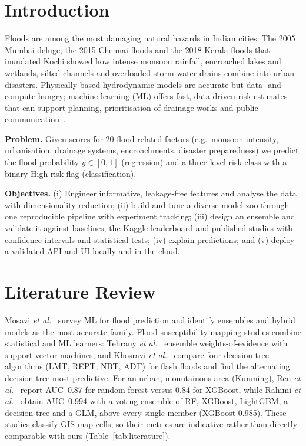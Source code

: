 \documentclass[conference]{IEEEtran}
\begin{document}
\section{Introduction}
Floods are among the most damaging natural hazards in Indian cities. The 2005 Mumbai deluge, the 2015 Chennai floods
and the 2018 Kerala floods that inundated Kochi showed how intense monsoon rainfall, encroached lakes and wetlands,
silted channels and overloaded storm-water drains combine into urban disasters. Physically based hydrodynamic models are
accurate but data- and compute-hungry; machine learning (ML) offers fast, data-driven risk estimates that can support
planning, prioritisation of drainage works and public communication~\cite{mosavi2018}.

\textbf{Problem.} Given scores for 20 flood-related factors (e.g.\ monsoon intensity, urbanisation, drainage systems,
encroachments, disaster preparedness) we predict the flood probability $y\in[0,1]$ (regression) and a three-level risk
class with a binary High-risk flag (classification).

\textbf{Objectives.} (i) Engineer informative, leakage-free features and analyse the data with dimensionality reduction;
(ii) build and tune a diverse model zoo through one reproducible pipeline with experiment tracking; (iii) design an
ensemble and validate it against baselines, the Kaggle leaderboard and published studies with confidence intervals and
statistical tests; (iv) explain predictions; and (v) deploy a validated API and UI locally and in the cloud.

\section{Literature Review}
Mosavi \emph{et al.}~\cite{mosavi2018} survey ML for flood prediction and identify ensembles and hybrid models as the most
accurate family. Flood-susceptibility mapping studies combine statistical and ML learners: Tehrany
\emph{et al.}~\cite{tehrany2014} ensemble weights-of-evidence with support vector machines, and Khosravi
\emph{et al.}~\cite{khosravi2018} compare four decision-tree algorithms (LMT, REPT, NBT, ADT) for flash floods and find
the alternating decision tree most predictive. For an urban, mountainous area (Kunming), Ren \emph{et al.}~\cite{ren2024}
report AUC~0.87 for random forest versus 0.84 for XGBoost, while Rahimi \emph{et al.}~\cite{rahimi2026} obtain AUC~0.994
with a voting ensemble of RF, XGBoost, LightGBM, a decision tree and a GLM, above every single member (XGBoost 0.985).
These studies classify GIS map cells, so their metrics are indicative rather than directly comparable with ours
(Table~\ref{tab:literature}).
\end{document}
